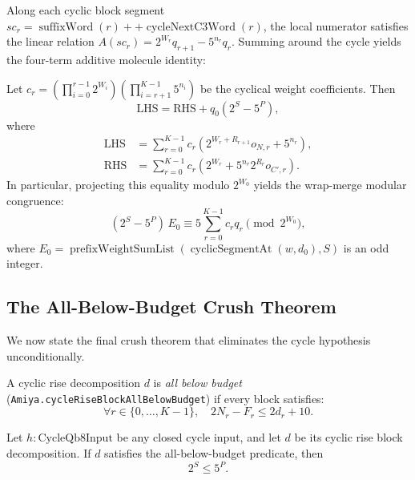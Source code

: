 Along each cyclic block segment $sc_r = \operatorname{suffixWord}(r) ++ \operatorname{cycleNextC3Word}(r)$, the local numerator satisfies the linear relation $A(sc_r) = 2^{W_r} q_{r+1} - 5^{n_r} q_r$.  Summing around the cycle yields the four-term additive molecule identity:

\begin{theorem}\label{thm:four-term}
Let $c_r = \left(\prod_{i=0}^{r-1} 2^{W_i}\right) \left(\prod_{i=r+1}^{K-1} 5^{n_i}\right)$ be the cyclical weight coefficients.  Then
\begin{equation}\label{eq:four-term-add}
  \mathrm{LHS} = \mathrm{RHS} + q_0 \left(2^S - 5^P\right),
\end{equation}
where
\begin{align*}
  \mathrm{LHS} &= \sum_{r=0}^{K-1} c_r \left( 2^{W_r + R_{r+1}} o_{N,r} + 5^{n_r} \right), \\
  \mathrm{RHS} &= \sum_{r=0}^{K-1} c_r \left( 2^{W_r} + 5^{n_r} 2^{R_r} o_{C',r} \right).
\end{align*}
In particular, projecting this equality modulo $2^{W_0}$ yields the wrap-merge modular congruence:
\begin{equation}\label{eq:wrap-merge-mod}
  (2^S - 5^P)\, E_0 \equiv 5 \sum_{r=0}^{K-1} c_r q_r \pmod{2^{W_0}},
\end{equation}
where $E_0 = \operatorname{prefixWeightSumList}(\operatorname{cyclicSegmentAt}(w, d_0), S)$ is an odd integer.
\end{theorem}

\subsection{The All-Below-Budget Crush Theorem}

We now state the final crush theorem that eliminates the cycle hypothesis unconditionally.

\begin{definition}\label{def:all-below-budget}
A cyclic rise decomposition $d$ is \emph{all below budget} (\texttt{Amiya.cycleRiseBlockAllBelowBudget}) if every block satisfies:
\begin{equation}\label{eq:below-budget-def}
  \forall r \in \{0,\dots,K-1\},\quad 2N_r - F_r \le 2d_r + 10.
\end{equation}
\end{definition}

\begin{theorem}\label{thm:crush-theorem}
Let $h : \mathrm{CycleQb8Input}$ be any closed cycle input, and let $d$ be its cyclic rise block decomposition.  If $d$ satisfies the all-below-budget predicate, then
\begin{equation*}
  2^S \le 5^P.
\end{equation*}
\end{theorem}

